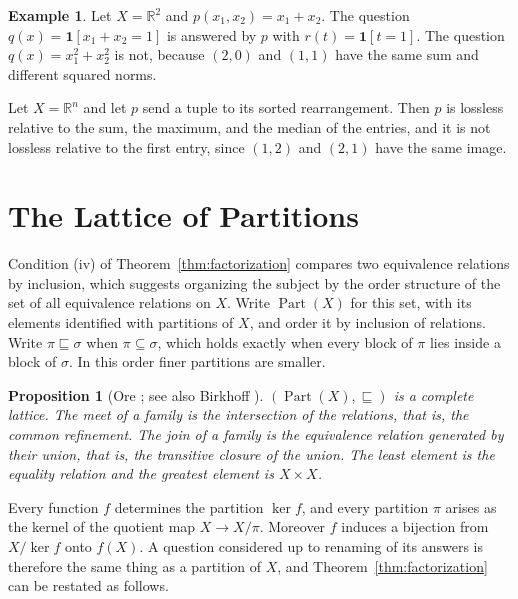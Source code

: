 \documentclass[11pt]{article}
\newtheorem{proposition}[theorem]{Proposition}
\theoremstyle{definition}
\newtheorem{example}[theorem]{Example}
\theoremstyle{remark}
\newcommand{\Part}{\operatorname{Part}}
\newcommand{\refines}{\sqsubseteq}
\newcommand{\R}{\mathbb{R}}
\begin{document}
\begin{example}\label{ex:basic}
Let $X=\R^2$ and $p(x_1,x_2)=x_1+x_2$. The question $q(x)=\mathbf 1[x_1+x_2=1]$ is answered by $p$ with $r(t)=\mathbf 1[t=1]$. The question $q(x)=x_1^2+x_2^2$ is not, because $(2,0)$ and $(1,1)$ have the same sum and different squared norms.

Let $X=\R^n$ and let $p$ send a tuple to its sorted rearrangement. Then $p$ is lossless relative to the sum, the maximum, and the median of the entries, and it is not lossless relative to the first entry, since $(1,2)$ and $(2,1)$ have the same image.
\end{example}

\section{The Lattice of Partitions}\label{sec:lattice}

Condition (iv) of Theorem~\ref{thm:factorization} compares two equivalence relations by inclusion, which suggests organizing the subject by the order structure of the set of all equivalence relations on $X$. Write $\Part(X)$ for this set, with its elements identified with partitions of $X$, and order it by inclusion of relations. Write $\pi\refines\sigma$ when $\pi\subseteq\sigma$, which holds exactly when every block of $\pi$ lies inside a block of $\sigma$. In this order finer partitions are smaller.

\begin{proposition}[Ore \cite{ore}; see also Birkhoff \cite{birkhoff}]\label{prop:lattice}
$(\Part(X),\refines)$ is a complete lattice. The meet of a family is the intersection of the relations, that is, the common refinement. The join of a family is the equivalence relation generated by their union, that is, the transitive closure of the union. The least element is the equality relation and the greatest element is $X\times X$.
\end{proposition}

Every function $f$ determines the partition $\ker f$, and every partition $\pi$ arises as the kernel of the quotient map $X\to X/\pi$. Moreover $f$ induces a bijection from $X/\ker f$ onto $f(X)$. A question considered up to renaming of its answers is therefore the same thing as a partition of $X$, and Theorem~\ref{thm:factorization} can be restated as follows.
\end{document}
